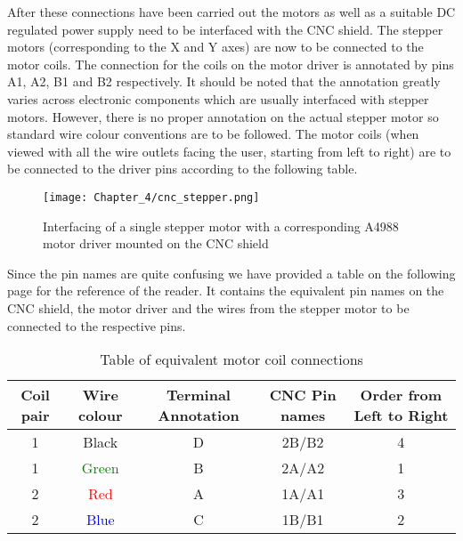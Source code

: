 After these connections have been carried out the motors as well as a suitable DC regulated power supply need to be interfaced with the CNC shield. The stepper motors (corresponding to the X and Y axes) are now to be connected to the motor coils. The connection for the coils on the motor driver is annotated by pins A1, A2, B1 and B2 respectively. It should be noted that the annotation greatly varies across electronic components which are usually interfaced with stepper motors. However, there is no proper annotation on the actual stepper motor so standard wire colour conventions are to be followed. The motor coils (when viewed with all the wire outlets facing the user, starting from left to right) are to be connected to the driver pins according to the following table. \par

\begin{figure}[h]
 \centering
 \texttt{[image: Chapter\_4/cnc\_stepper.png]}
 \caption{Interfacing of a single stepper motor with a corresponding A4988 motor driver mounted on the CNC shield}
 \label{fig:cnc_stepper}
\end{figure}


Since the pin names are quite confusing we have provided a table on the following page for the reference of the reader. It contains the equivalent pin names on the CNC shield, the motor driver and the wires from the stepper motor to be connected to the respective pins. \pagebreak

\begin{table}[h]
 \def\arraystretch{1.5}
 \centering
 \caption{Table of equivalent motor coil connections}
 \begin{tabular}{|c|c|c|c|c|}
  \hline
  Coil pair & Wire colour              & Terminal Annotation & CNC Pin names & Order from Left to Right \\
  \hline
  1         & Black                    & D                   & 2B/B2         & 4                        \\
  \hline
  1         & \textcolor{green}{Green} & B                   & 2A/A2         & 1                        \\
  \hline
  2         & \textcolor{red}{Red}     & A                   & 1A/A1         & 3                        \\
  \hline
  2         & \textcolor{blue}{Blue}   & C                   & 1B/B1         & 2                        \\
  \hline
 \end{tabular}
 \label{tab:mccons}
\end{table}


